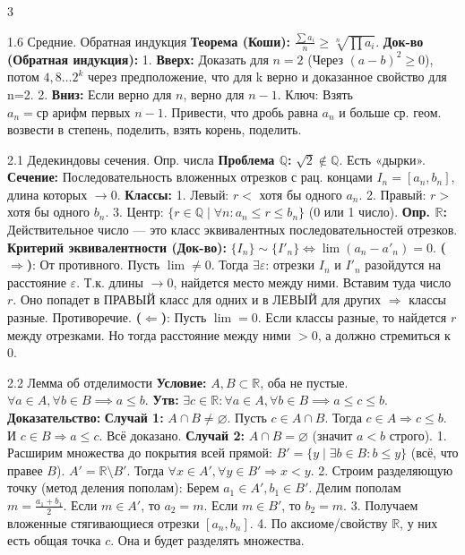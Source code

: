 \documentclass[8pt, a4paper, landscape]{extarticle}
\newcommand{\Ra}{\Rightarrow}
\newcommand{\Q}{\mathbb{Q}}
\newcommand{\R}{\mathbb{R}}
\newcommand{\eps}{\varepsilon}
\begin{document}
\begin{multicols*}{3}
\begin{ticket}{1.6 Средние. Обратная индукция}
\textbf{Теорема (Коши):} $\frac{\sum a_i}{n} \ge \sqrt[n]{\prod a_i}$.
\textbf{Док-во (Обратная индукция):}
1. \textbf{Вверх:} Доказать для $n=2$ (Через $(a-b)^2 \ge 0$), потом $4, 8 \dots 2^k$ через предположение, что для k верно и доказанное свойство для n=2.
2. \textbf{Вниз:} Если верно для $n$, верно для $n-1$.
Ключ: Взять $a_n = \text{ср арифм первых } n-1$. Привести, что дробь равна $a_n$ и больше ср. геом. возвести в степень, поделить, взять корень, поделить. 
\end{ticket}


\begin{ticket}{2.1 Дедекиндовы сечения. Опр. числа}
\textbf{Проблема $\Q$:} $\sqrt{2} \notin \Q$. Есть «дырки».
\textbf{Сечение:} Последовательность вложенных отрезков с рац. концами $I_n = [a_n, b_n]$, длина которых $\to 0$.
\textbf{Классы:}
1. Левый: $r <$ хотя бы одного $a_n$.
2. Правый: $r >$ хотя бы одного $b_n$.
3. Центр: $\{r \in \Q \mid \forall n: a_n \le r \le b_n\}$ (0 или 1 число).
\textbf{Опр. $\R$:} Действительное число — это класс эквивалентных последовательностей отрезков.
\tcblower
\textbf{Критерий эквивалентности (Док-во):}
$\{I_n\} \sim \{I'_n\} \iff \lim(a_n - a'_n) = 0$.
\textbf{($\Ra$)}: От противного. Пусть $\lim \ne 0$. Тогда $\exists \eps$: отрезки $I_n$ и $I'_n$ разойдутся на расстояние $\eps$.
Т.к. длины $\to 0$, найдется место между ними.
Вставим туда число $r$. Оно попадет в ПРАВЫЙ класс для одних и в ЛЕВЫЙ для других $\Ra$ классы разные. Противоречие.
\textbf{($\Leftarrow$)}: Пусть $\lim = 0$. Если классы разные, то найдется $r$ между отрезками. Но тогда расстояние между ними $>0$, а должно стремиться к 0.
\end{ticket}

\begin{ticket}{2.2 Лемма об отделимости}
\textbf{Условие:} $A, B \subset \R$, оба не пустые.
$\forall a \in A, \forall b \in B \implies a \le b$.
\textbf{Утв:} $\exists c \in \R: \forall a \in A, \forall b \in B \implies a \le c \le b$.
\tcblower
\textbf{Доказательство:}
\textbf{Случай 1:} $A \cap B \ne \varnothing$.
Пусть $c \in A \cap B$. Тогда $c \in A \Ra c \le b$. И $c \in B \Ra a \le c$. Всё доказано.
\textbf{Случай 2:} $A \cap B = \varnothing$ (значит $a < b$ строго).
1. Расширим множества до покрытия всей прямой:
$B' = \{y \mid \exists b \in B: b \le y\}$ (всё, что правее $B$).
$A' = \R \setminus B'$. Тогда $\forall x \in A', \forall y \in B' \Ra x < y$.
2. Строим разделяющую точку (метод деления пополам):
Берем $a_1 \in A', b_1 \in B'$. Делим пополам $m = \frac{a_1+b_1}{2}$.
Если $m \in A'$, то $a_2=m$. Если $m \in B'$, то $b_2=m$.
3. Получаем вложенные стягивающиеся отрезки $[a_n, b_n]$.
4. По аксиоме/свойству $\R$, у них есть общая точка $c$.
Она и будет разделять множества.
\end{ticket}


\end{multicols*}
\end{document}
